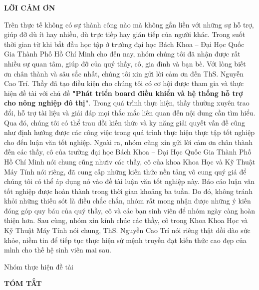 \documentclass[a4paper,12pt,oneside]{article}
\begin{document}
\newpage
\begin{center}
{\fontsize{20pt}{1}\selectfont \textbf{LỜI CẢM ƠN}}\\[1cm]
\end{center}
Trên thực tế không có sự thành công nào mà không gắn liền với những sự hỗ trợ, giúp
đỡ dù ít hay nhiều, dù trực tiếp hay gián tiếp của người khác. Trong suốt thời gian từ
khi bắt đầu học tập ở trường đại học Bách Khoa – Đại Học Quốc Gia Thành Phố Hồ
Chí Minh cho đến nay, nhóm chúng tôi đã nhận được rất nhiều sự quan tâm, giúp đỡ
của quý thầy, cô, gia đình và bạn bè.
Với lòng biết ơn chân thành và sâu sắc nhất, chúng tôi xin gửi lời cảm ơn đến ThS. Nguyễn Cao Trí. Thầy đã tạo điều kiện cho chúng tôi có cơ hội được tham gia và thực hiện
đề tài với chủ đề \textbf{"Phát triển board điều khiển và hệ thống hỗ trợ cho nông nghiệp đô thị"}. Trong quá trình thực hiện, thầy thường xuyên trao đổi, hỗ
trợ tài liệu và giải đáp mọi thắc mắc liên quan đến nội dung cần tìm hiểu. Qua đó, chúng
tôi có thể trau dồi kiến thức và ky năng giải quyết vấn đề cũng như định hướng được
các công việc trong quá trình thực hiện thực tập tốt nghiệp cho đến luận văn tốt nghiệp.
Ngoài ra, nhóm cũng xin gửi lời cảm ơn chân thành đến các thầy, cô của trường
đại học Bách Khoa – Đại Học Quốc Gia Thành Phố Hồ Chí Minh nói chung cũng nhưiv
các thầy, cô của khoa Khoa Học và Kỹ Thuật Máy Tính nói riêng, đã cung cấp những
kiến thức nền tảng vô cung quý giá để chúng tôi có thể áp dụng nó vào đề tài luận
văn tốt nghiệp này.
Báo cáo luận văn tốt nghiệp được hoàn thành trong thời gian khoảng ba tuần. Do đó,
không tránh khỏi những thiếu sót là điều chắc chắn, nhóm rất mong nhận được những
ý kiến đóng góp quy báu của quý thầy, cô và các bạn sinh viên để nhóm ngày càng
hoàn thiện hơn.
Sau cùng, nhóm xin kính chúc các thầy, cô trong Khoa Khoa Học và Kỹ Thuật
Máy Tính nói chung, ThS. Nguyễn Cao Trí nói riêng thật dồi dào sức khỏe, niềm tin
để tiếp tục thực hiện sứ mệnh truyền đạt kiến thức cao đẹp của mình cho thế hệ sinh
viên mai sau.
\begin{flushright}
Nhóm thực hiện đề tài
\end{flushright}
\newpage
\begin{center}
{\fontsize{20pt}{1}\selectfont \textbf{TÓM TẮT}}\\[1cm]
\end{center}
\end{document}
